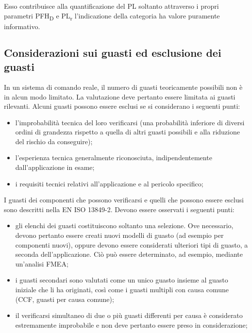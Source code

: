 Esso contribuisce alla quantificazione del PL soltanto attraverso i propri parametri PFH\textsubscript{D} e PL\textsubscript{r} l'indicazione della categoria ha valore puramente informativo.

\subsection{Considerazioni sui guasti ed esclusione dei guasti}
\label{subsec:06-2-10}
In un sistema di comando reale, il numero di guasti teoricamente possibili non è in alcun modo limitato. La valutazione deve pertanto essere limitata ai guasti rilevanti. Alcuni guasti possono essere esclusi se si considerano i seguenti punti:
\begin{itemize}
    \item l'improbabilità tecnica del loro verificarsi (una probabilità inferiore di diversi ordini di grandezza rispetto a quella di altri guasti possibili e alla riduzione del rischio da conseguire);
    \item l'esperienza tecnica generalmente riconosciuta, indipendentemente dall'applicazione in esame;
    \item i requisiti tecnici relativi all'applicazione e al pericolo specifico;
\end{itemize}

I guasti dei componenti che possono verificarsi e quelli che possono essere esclusi sono descritti nella EN ISO 13849-2. Devono essere osservati i seguenti punti:
\begin{itemize}
    \item gli elenchi dei guasti costituiscono soltanto una selezione. Ove necessario, devono pertanto essere creati nuovi modelli di guasto (ad esempio per componenti nuovi), oppure devono essere considerati ulteriori tipi di guasto, a seconda dell'applicazione. Ciò può essere determinato, ad esempio, mediante un'analisi FMEA;
    \item i guasti secondari sono valutati come un unico guasto insieme al guasto iniziale che li ha originati, così come i guasti multipli con causa comune (CCF, guasti per causa comune);
    \item il verificarsi simultaneo di due o più guasti differenti per causa è considerato estremamente improbabile e non deve pertanto essere preso in considerazione;
\end{itemize}


